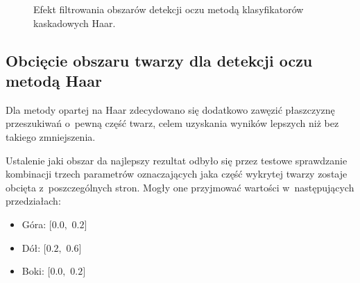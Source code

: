 \begin{figure}[!h]
    \begin{center}
        \hspace{8mm}
    \end{center}
    \caption{Efekt filtrowania obszarów detekcji oczu metodą klasyfikatorów kaskadowych Haar.}
    \label{fig:eye_filter}
\end{figure}

\subsection{Obcięcie obszaru twarzy dla detekcji oczu metodą Haar}

Dla metody opartej na Haar zdecydowano się dodatkowo zawęzić płaszczyznę przeszukiwań o~pewną część twarz, celem uzyskania wyników lepszych niż bez takiego zmniejszenia. 

\par

Ustalenie jaki obszar da najlepszy rezultat odbyło się przez testowe sprawdzanie kombinacji trzech parametrów oznaczających jaka część wykrytej twarzy zostaje obcięta z~poszczególnych stron. Mogły one przyjmować wartości w~następujących przedziałach:

\begin{itemize}
    \item Góra: $[0.0,$ $0.2]$
    \item Dół: $[0.2,$ $0.6]$
    \item Boki: $[0.0,$ $0.2]$
\end{itemize}

